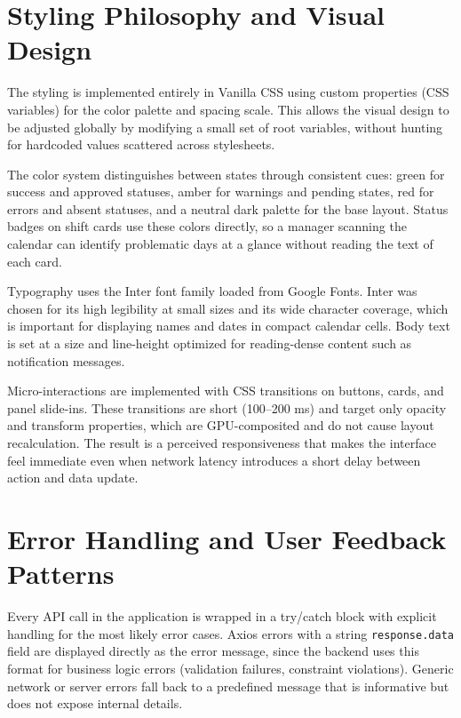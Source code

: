 \section{Styling Philosophy and Visual Design}
\par The styling is implemented entirely in Vanilla CSS \cite{cssVanillaLayout} using custom properties (CSS variables) for the color palette and spacing scale. This allows the visual design to be adjusted globally by modifying a small set of root variables, without hunting for hardcoded values scattered across stylesheets.

\par The color system distinguishes between states through consistent cues: green for success and approved statuses, amber for warnings and pending states, red for errors and absent statuses, and a neutral dark palette for the base layout. Status badges on shift cards use these colors directly, so a manager scanning the calendar can identify problematic days at a glance without reading the text of each card.

\par Typography uses the Inter font family loaded from Google Fonts. Inter was chosen for its high legibility at small sizes and its wide character coverage, which is important for displaying names and dates in compact calendar cells. Body text is set at a size and line-height optimized for reading-dense content such as notification messages.

\par Micro-interactions are implemented with CSS transitions on buttons, cards, and panel slide-ins. These transitions are short (100–200 ms) and target only opacity and transform properties, which are GPU-composited and do not cause layout recalculation. The result is a perceived responsiveness that makes the interface feel immediate even when network latency introduces a short delay between action and data update.

\section{Error Handling and User Feedback Patterns}
\par Every API call in the application is wrapped in a try/catch block with explicit handling for the most likely error cases. Axios errors with a string \texttt{response.data} field are displayed directly as the error message, since the backend uses this format for business logic errors (validation failures, constraint violations). Generic network or server errors fall back to a predefined message that is informative but does not expose internal details.

